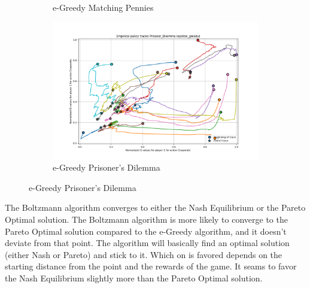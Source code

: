 \documentclass[12pt,letterpaper, onecolumn]{exam}
\begin{document}
\begin{figure}
\begin{subfigure}{.5\textwidth}
      \caption{e-Greedy Matching Pennies}
      \label{fig:sfigemp}
    \end{subfigure}%
    \begin{subfigure}{.5\textwidth}
      \centering
      \includegraphics[width=.6\linewidth]{plots/replicator_trajectoreis_Prisoner_Dilemma_epsilon_greedy.png}
      \caption{e-Greedy Prisoner's Dilemma}
      \label{fig:sfigepd}
    \end{subfigure}%
\end{figure}

The Boltzmann algorithm converges to either the Nash Equilibrium or the Pareto Optimal solution. The Boltzmann algorithm is more likely to converge to the Pareto Optimal solution
compared to the e-Greedy algorithm, and it doesn't deviate from that point. The algorithm will basically find an optimal solution (either Nash or Pareto) and stick to it.
Which on is favored depends on the starting distance from the point and the rewards of the game. It seams to favor the Nash Equilibrium slightly more than the Pareto Optimal solution.
\end{document}
